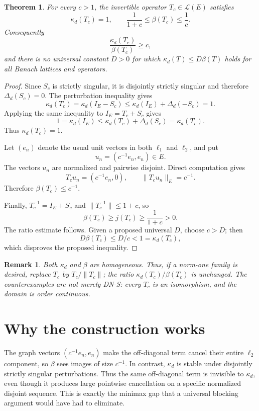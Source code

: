 \documentclass[11pt]{article}
\newtheorem{theorem}{Theorem}
\newtheorem{remark}{Remark}
\newcommand{\Lin}{\mathcal L}
\begin{document}
\begin{theorem}\label{thm:counterexample}
For every $c>1$, the invertible operator $T_c\in\Lin(E)$ satisfies
\[
  \kappa_d(T_c)=1,
  \qquad
  \frac{1}{1+c}\leq\beta(T_c)\leq\frac1c.
\]
Consequently
\[
  \frac{\kappa_d(T_c)}{\beta(T_c)}\geq c,
\]
and there is no universal constant $D>0$ for which
$\kappa_d(T)\leq D\beta(T)$ holds for all Banach lattices and operators.
\end{theorem}

\begin{proof}
Since $S_c$ is strictly singular, it is disjointly strictly singular and
therefore $\Delta_d(S_c)=0$.  The perturbation inequality gives
\[
  \kappa_d(T_c)
  =\kappa_d(I_E-S_c)
  \leq\kappa_d(I_E)+\Delta_d(-S_c)=1.
\]
Applying the same inequality to $I_E=T_c+S_c$ gives
\[
  1=\kappa_d(I_E)
  \leq\kappa_d(T_c)+\Delta_d(S_c)=\kappa_d(T_c).
\]
Thus $\kappa_d(T_c)=1$.

Let $(e_n)$ denote the usual unit vectors in both $\ell_1$ and $\ell_2$,
and put
\[
  u_n=(c^{-1}e_n,e_n)\in E.
\]
The vectors $u_n$ are normalized and pairwise disjoint.  Direct computation
gives
\[
  T_cu_n=(c^{-1}e_n,0),
  \qquad
  \|T_cu_n\|_E=c^{-1}.
\]
Therefore $\beta(T_c)\leq c^{-1}$.

Finally, $T_c^{-1}=I_E+S_c$ and $\|T_c^{-1}\|\leq1+c$, so
\[
  \beta(T_c)\geq j(T_c)\geq\frac1{1+c}>0.
\]
The ratio estimate follows.  Given a proposed universal $D$, choose
$c>D$; then
\[
  D\beta(T_c)\leq D/c<1=\kappa_d(T_c),
\]
which disproves the proposed inequality.
\end{proof}

\begin{remark}
Both $\kappa_d$ and $\beta$ are homogeneous.  Thus, if a norm-one family is
desired, replace $T_c$ by $T_c/\|T_c\|$; the ratio
$\kappa_d(T_c)/\beta(T_c)$ is unchanged.  The counterexamples are not merely
DN-S: every $T_c$ is an isomorphism, and the domain is order continuous.
\end{remark}

\section*{Why the construction works}

The graph vectors $(c^{-1}e_n,e_n)$ make the off-diagonal term cancel their
entire $\ell_2$ component, so $\beta$ sees images of size $c^{-1}$.  In
contrast, $\kappa_d$ is stable under disjointly strictly singular
perturbations.  Thus the same off-diagonal term is invisible to
$\kappa_d$, even though it produces large pointwise cancellation on a
specific normalized disjoint sequence.  This is exactly the minimax gap
that a universal blocking argument would have had to eliminate.
\end{document}
